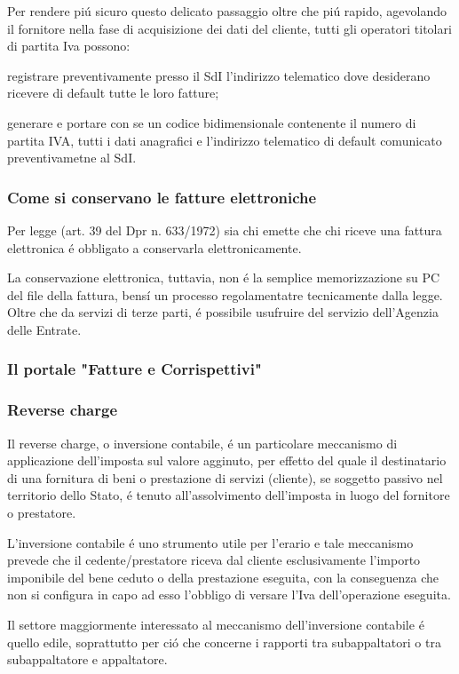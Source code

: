 \documentclass{article}
\begin{document}
Per rendere pi\'u sicuro questo delicato passaggio oltre che pi\'u rapido, agevolando il fornitore nella fase di acquisizione dei dati del cliente, tutti gli operatori titolari di partita Iva possono: 

registrare preventivamente presso il SdI l'indirizzo telematico dove desiderano ricevere di default tutte le loro fatture;

generare e portare con se un codice bidimensionale contenente il numero di partita IVA, tutti i dati anagrafici e l'indirizzo telematico di default comunicato preventivametne al SdI. 

\subsubsection{Come si conservano le fatture elettroniche}
Per legge (art. 39 del Dpr n. 633/1972) sia chi emette che chi riceve una fattura elettronica \'e obbligato a conservarla elettronicamente.

La conservazione elettronica, tuttavia, non \'e la semplice memorizzazione su PC del file della fattura, bens\'i un processo regolamentatre tecnicamente dalla legge. Oltre che da servizi di terze parti, \'e possibile usufruire del servizio dell'Agenzia delle Entrate. 

\subsubsection{Il portale "Fatture e Corrispettivi"}

\subsubsection{Reverse charge}
Il reverse charge, o inversione contabile, \'e un particolare meccanismo di applicazione dell'imposta sul valore agginuto, per effetto del quale il destinatario di una fornitura di beni o prestazione di servizi (cliente), se soggetto passivo nel territorio dello Stato, \'e tenuto all'assolvimento dell'imposta in luogo del fornitore o prestatore.

L'inversione contabile \'e uno strumento utile per l'erario e tale meccanismo prevede che il cedente/prestatore riceva dal cliente esclusivamente l'importo imponibile del bene ceduto o della prestazione eseguita, con la conseguenza che non si configura in capo ad esso l'obbligo di versare l'Iva dell'operazione eseguita. 

Il settore maggiormente interessato al meccanismo dell'inversione contabile \'e quello edile, soprattutto per ci\'o che concerne i rapporti tra subappaltatori o tra subappaltatore e appaltatore.
\end{document}
